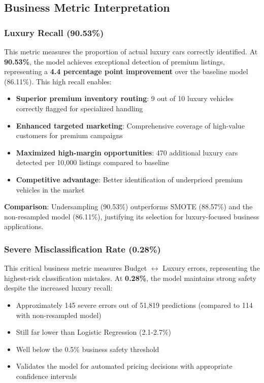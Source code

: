 \documentclass[12pt, a4paper]{article}
\begin{document}
\subsection{Business Metric Interpretation}

\subsubsection{Luxury Recall (90.53\%)}
This metric measures the proportion of actual luxury cars correctly identified. At \textbf{90.53\%}, the model achieves exceptional detection of premium listings, representing a \textbf{4.4 percentage point improvement} over the baseline model (86.11\%). This high recall enables:
\begin{itemize}
    \item \textbf{Superior premium inventory routing}: 9 out of 10 luxury vehicles correctly flagged for specialized handling
    \item \textbf{Enhanced targeted marketing}: Comprehensive coverage of high-value customers for premium campaigns
    \item \textbf{Maximized high-margin opportunities}: 470 additional luxury cars detected per 10,000 listings compared to baseline
    \item \textbf{Competitive advantage}: Better identification of underpriced premium vehicles in the market
\end{itemize}

\textbf{Comparison}: Undersampling (90.53\%) outperforms SMOTE (88.57\%) and the non-resampled model (86.11\%), justifying its selection for luxury-focused business applications.

\subsubsection{Severe Misclassification Rate (0.28\%)}
This critical business metric measures Budget $\leftrightarrow$ Luxury errors, representing the highest-risk classification mistakes. At \textbf{0.28\%}, the model maintains strong safety despite the increased luxury recall:
\begin{itemize}
    \item Approximately 145 severe errors out of 51,819 predictions (compared to 114 with non-resampled model)
    \item Still far lower than Logistic Regression (2.1-2.7\%)
    \item Well below the 0.5\% business safety threshold
    \item Validates the model for automated pricing decisions with appropriate confidence intervals
\end{itemize}
\end{document}
